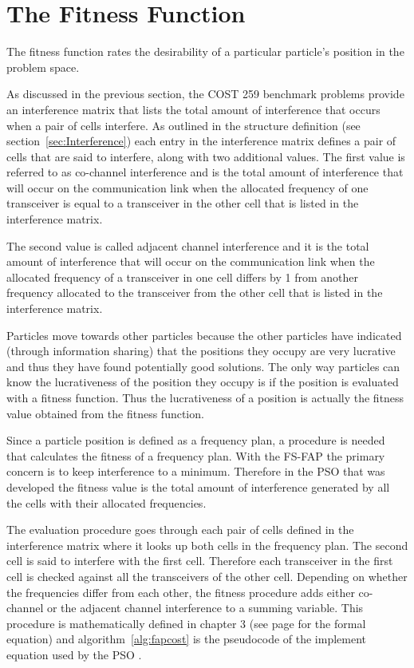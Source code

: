 \section{The Fitness Function}
The fitness function rates the desirability of a particular particle's position in the problem space.

As discussed in the previous section, the COST 259 benchmark problems provide an interference matrix that lists the total amount of interference that occurs when a pair of cells interfere. As outlined in the structure definition (see section~\ref{sec:Interference}) each entry in the interference matrix defines a pair of cells that are said to interfere, along with two additional values. The first value is referred to as co-channel interference and is the total amount of interference that will occur on the communication link when the allocated frequency of one transceiver is equal to a transceiver in the other cell that is listed in the interference matrix. 

The second value is called adjacent channel interference and it is the total amount of interference that will occur on the communication link when the allocated frequency of a transceiver in one cell differs by 1 from another frequency allocated to the transceiver from the other cell that is listed in the interference matrix.

Particles move towards other particles because the other particles have indicated (through information sharing) that the positions they occupy are very lucrative and thus they have found potentially good solutions. The only way particles can know the lucrativeness of the position they occupy is if the position is evaluated with a fitness function. Thus the lucrativeness of a position is actually the fitness value obtained from the fitness function. 

Since a particle position is defined as a frequency plan, a procedure is needed that calculates the fitness of a frequency plan. With the \gls{FS-FAP} the primary concern is to keep interference to a minimum. Therefore in the \gls{PSO} that was developed the fitness value is the total amount of interference generated by all the cells with their allocated frequencies. 

The evaluation procedure goes through each pair of cells defined in the interference matrix where it looks up both cells in the frequency plan. The second cell is said to interfere with the first cell. Therefore each transceiver in the first cell is checked against all the transceivers of the other cell. Depending on whether the frequencies differ from each other, the fitness procedure adds either co-channel or the adjacent channel interference to a summing variable. This procedure is mathematically defined in chapter 3 (see page \pageref{E:costFunction} for the formal equation) and algorithm~\ref{alg:fapcost} is the pseudocode of the implement equation used by the \gls{PSO} . 

